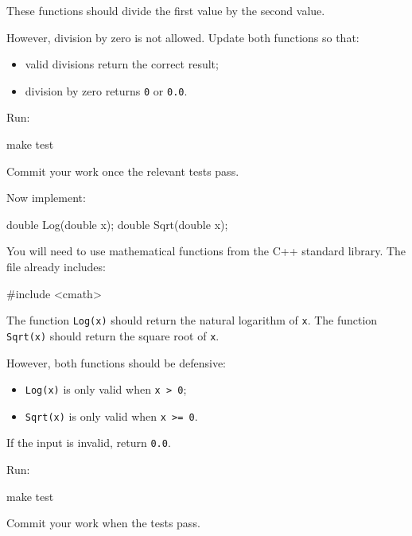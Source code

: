 \documentclass{csc2059practical}
\begin{document}
These functions should divide the first value by the second value.

However, division by zero is not allowed. Update both functions so that:

\begin{itemize}
  \item valid divisions return the correct result;
  \item division by zero returns \texttt{0} or \texttt{0.0}.
\end{itemize}

Run:

\begin{bashcode}
make test
\end{bashcode}

Commit your work once the relevant tests pass.


Now implement:

\begin{cppcode}
double Log(double x);
double Sqrt(double x);
\end{cppcode}

You will need to use mathematical functions from the C++ standard library. The file already includes:

\begin{cppcode}
#include <cmath>
\end{cppcode}

The function \texttt{Log(x)} should return the natural logarithm of \texttt{x}. The function \texttt{Sqrt(x)} should return the square root of \texttt{x}.

However, both functions should be defensive:

\begin{itemize}
  \item \texttt{Log(x)} is only valid when \texttt{x > 0};
  \item \texttt{Sqrt(x)} is only valid when \texttt{x >= 0}.
\end{itemize}

If the input is invalid, return \texttt{0.0}.

Run:

\begin{bashcode}
make test
\end{bashcode}

Commit your work when the tests pass.

\end{document}
